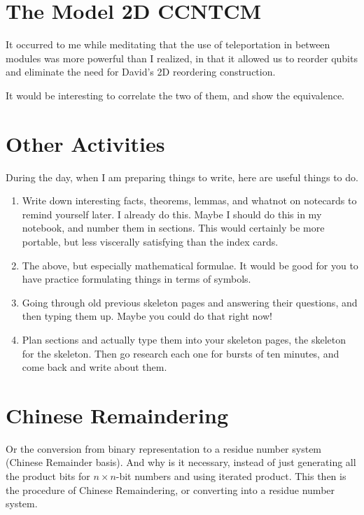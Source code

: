 \documentclass{article}
\begin{document}
\section{The Model \textsf{2D CCNTCM}}

It occurred to me while meditating that the use of teleportation in
between modules was more powerful than I realized, in that it allowed
us to reorder qubits and eliminate the need for David's 2D reordering
construction.

It would be interesting to correlate the two of them, and show the 
equivalence.

\section{Other Activities}

During the day, when I am preparing things to write, here are useful
things to do.

\begin{enumerate}
\item
Write down interesting facts, theorems, lemmas, and whatnot on notecards
to remind yourself later. I already do this. Maybe I should do this in
my notebook, and number them in sections. This would certainly be more
portable, but less viscerally satisfying than the index cards.

\item
The above, but especially mathematical formulae. It would be good for you
to have practice formulating things in terms of symbols.

\item
Going through old previous skeleton pages and answering their questions,
and then typing them up. Maybe you could do that right now!

\item
Plan sections and actually type them into your skeleton pages, the skeleton
for the skeleton. Then go research each one for bursts of ten minutes,
and come back and write about them.

\end{enumerate}

\section{Chinese Remaindering}

Or the conversion from binary representation to a residue number system
(Chinese Remainder basis). And why is it necessary, instead of
just generating all the product bits for $n\times n$-bit numbers and
using iterated product. This then is the procedure of Chinese Remaindering,
or converting into a residue number system.
\end{document}
